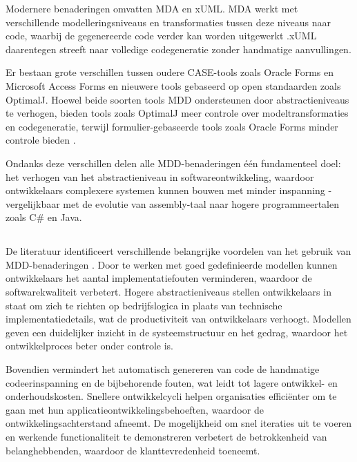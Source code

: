 Modernere benaderingen omvatten \gls{MDA} en \gls{xUML}. \gls{MDA} werkt met verschillende modelleringsniveaus en transformaties tussen deze niveaus naar code, waarbij de gegenereerde code verder kan worden uitgewerkt \autocite{Soley2000}.\gls{xUML} daarentegen streeft naar volledige codegeneratie zonder handmatige aanvullingen.

Er bestaan grote verschillen tussen oudere \gls{CASE}-tools zoals Oracle Forms en Microsoft Access Forms en nieuwere tools gebaseerd op open standaarden zoals OptimalJ. Hoewel beide soorten tools \gls{MDD} ondersteunen door abstractieniveaus te verhogen, bieden tools zoals OptimalJ meer controle over modeltransformaties en codegeneratie, terwijl formulier-gebaseerde tools zoals Oracle Forms minder controle bieden \autocite{Henkel2010}.

Ondanks deze verschillen delen alle \gls{MDD}-benaderingen één fundamenteel doel: het verhogen van het abstractieniveau in softwareontwikkeling, waardoor ontwikkelaars complexere systemen kunnen bouwen met minder inspanning - vergelijkbaar met de evolutie van assembly-taal naar hogere programmeertalen zoals C\# en Java.


\subsection{}%
De literatuur identificeert verschillende belangrijke voordelen van het gebruik van \gls{MDD}-benaderingen \autocite{Soley2000}. Door te werken met goed gedefinieerde modellen kunnen ontwikkelaars het aantal implementatiefouten verminderen, waardoor de softwarekwaliteit verbetert. Hogere abstractieniveaus stellen ontwikkelaars in staat om zich te richten op bedrijfslogica in plaats van technische implementatiedetails, wat de productiviteit van ontwikkelaars verhoogt. Modellen geven een duidelijker inzicht in de systeemstructuur en het gedrag, waardoor het ontwikkelproces beter onder controle is.

Bovendien vermindert het automatisch genereren van code de handmatige codeerinspanning en de bijbehorende fouten, wat leidt tot lagere ontwikkel- en onderhoudskosten. Snellere ontwikkelcycli helpen organisaties efficiënter om te gaan met hun applicatieontwikkelingsbehoeften, waardoor de ontwikkelingsachterstand afneemt. De mogelijkheid om snel iteraties uit te voeren en werkende functionaliteit te demonstreren verbetert de betrokkenheid van belanghebbenden, waardoor de klanttevredenheid toeneemt.

